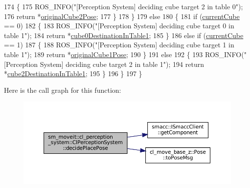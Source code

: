 \begin{DoxyCode}
174             \{
175                 ROS\_INFO(\textcolor{stringliteral}{"[Perception System] deciding cube target 2 in table 0"});
176                 \textcolor{keywordflow}{return} *\hyperlink{classsm__moveit_1_1cl__perception__system_1_1ClPerceptionSystem_a7d8cdfe20da5b47871adf9d3dce11338}{originalCube2Pose};
177             \}
178         \}
179         \textcolor{keywordflow}{else}
180         \{
181             \textcolor{keywordflow}{if} (\hyperlink{classsm__moveit_1_1cl__perception__system_1_1ClPerceptionSystem_a0ffeadfa41480c9d4d0fcc509237dff6}{currentCube} == 0)
182             \{
183                 ROS\_INFO(\textcolor{stringliteral}{"[Perception System] deciding cube target 0 in table 1"});
184                 \textcolor{keywordflow}{return} *\hyperlink{classsm__moveit_1_1cl__perception__system_1_1ClPerceptionSystem_ab84bbc2d5e5a7ef7839a0ade56942679}{cube0DestinationInTable1};
185             \}
186             \textcolor{keywordflow}{else} \textcolor{keywordflow}{if} (\hyperlink{classsm__moveit_1_1cl__perception__system_1_1ClPerceptionSystem_a0ffeadfa41480c9d4d0fcc509237dff6}{currentCube} == 1)
187             \{
188                 ROS\_INFO(\textcolor{stringliteral}{"[Perception System] deciding cube target 1 in table 1"});
189                 \textcolor{keywordflow}{return} *\hyperlink{classsm__moveit_1_1cl__perception__system_1_1ClPerceptionSystem_ab8851b53535efa7e154248c119e8c3cd}{originalCube1Pose};
190             \}
191             \textcolor{keywordflow}{else}
192             \{
193                 ROS\_INFO(\textcolor{stringliteral}{"[Perception System] deciding cube target 2 in table 1"});
194                 \textcolor{keywordflow}{return} *\hyperlink{classsm__moveit_1_1cl__perception__system_1_1ClPerceptionSystem_abb792620853ba381aa0736b884dabe92}{cube2DestinationInTable1};
195             \}
196         \}
197     \}
\end{DoxyCode}
Here is the call graph for this function\+:
\nopagebreak
\begin{figure}[H]
\begin{center}
\leavevmode
\includegraphics[width=350pt]{classsm__moveit_1_1cl__perception__system_1_1ClPerceptionSystem_a354f357ec7bc5438e7eeab2006868261_cgraph}
\end{center}
\end{figure}

